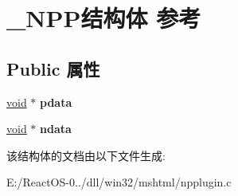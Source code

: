 \hypertarget{struct___n_p_p}{}\section{\+\_\+\+N\+P\+P结构体 参考}
\label{struct___n_p_p}
\subsection*{Public 属性}
\begin{DoxyCompactItemize}
\item 
\mbox{\label{struct___n_p_p_aaa6688d5b2a25be78d23122713ba9669}} 
\hyperlink{interfacevoid}{void} $\ast$ {\bfseries pdata}
\item 
\mbox{\label{struct___n_p_p_a5a30fd63122dc07580ef5db2913feec8}} 
\hyperlink{interfacevoid}{void} $\ast$ {\bfseries ndata}
\end{DoxyCompactItemize}


该结构体的文档由以下文件生成\+:\begin{DoxyCompactItemize}
\item 
E\+:/\+React\+O\+S-\/0../dll/win32/mshtml/npplugin.\+c\end{DoxyCompactItemize}
